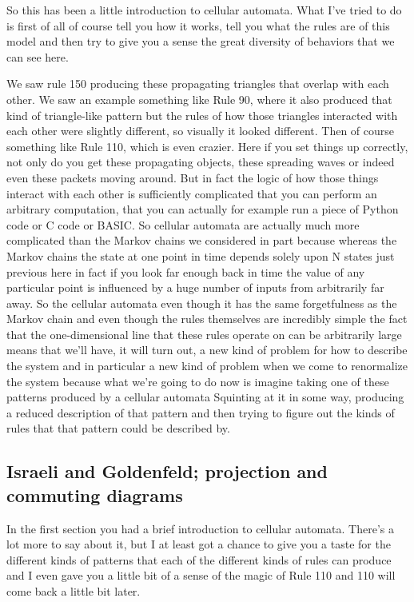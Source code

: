 \documentclass[]{article}
\begin{document}
So this has been a little introduction to cellular automata. What I've tried to do is first of all of course tell you how it works, tell you what the rules are of this model and then try to give you a sense the great diversity of behaviors that we can see here.

We saw rule 150 producing these propagating triangles that overlap with each other.
We saw an example something like Rule 90, where it also produced that kind of triangle-like pattern but the rules of how those triangles interacted with each other
were slightly different, so visually it looked different.
Then of course something like Rule 110, which is even crazier. Here if you set things up correctly, not only do you get these propagating objects, these spreading waves or indeed even these packets moving around.
But in fact the logic of how those things interact with each other is sufficiently complicated that you can perform an arbitrary computation,
that you can actually for example run
a piece of Python code or C code or BASIC.
So cellular automata are actually much more
complicated than the Markov chains we considered
in part because whereas the Markov chains
the state at one point in time
depends solely upon N states just previous
here in fact if you look far enough back in time
the value of any particular point
is influenced by a huge number
of inputs from arbitrarily far away.
So the cellular automata even
though it has the same forgetfulness
as the Markov chain
and even though the rules
themselves are incredibly simple
the fact that the one-dimensional line that these rules operate on can be arbitrarily large means that we'll have, it will turn out, a new kind of problem for how to describe the system and in particular a new kind of problem when we come to renormalize the system because what we're going to do now is imagine taking one of these patterns produced by a cellular automata
Squinting at it in some way, producing a reduced description of that pattern and then trying to figure out the kinds of rules that that pattern could be described by.

\subsection{Israeli and Goldenfeld; projection and commuting diagrams }

In the first section you had a brief introduction to cellular automata. There's a lot more to say about it, but I at least got a chance to give you a taste for the different kinds of patterns that each of the different kinds of rules can produce and I even gave you a little bit of a sense of the magic of Rule 110 and 110 will come back a little bit later.
\end{document}
